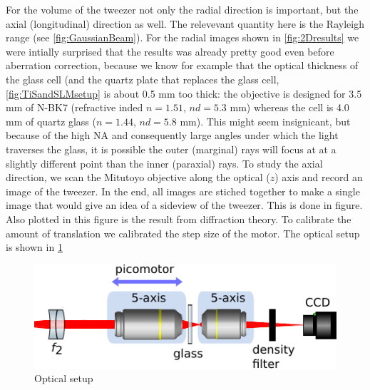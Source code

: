 For the volume of the tweezer not only the radial direction is important, but the axial (longitudinal) direction as well. 
The relevevant quantity here is the Rayleigh range (see \cref{fig:GaussianBeam}).
For the radial images shown in \cref{fig:2Dresults} we were intially surprised that the results was already pretty good even before aberration correction, because we know for example that the optical thickness of the glass cell (and the quartz plate that replaces the glass cell, \cref{fig:TiSandSLMsetup} is about 0.5 mm too thick: the objective is designed for 3.5 mm of N-BK7 (refractive inded $n = 1.51$, $nd = 5.3$ mm) whereas the cell is 4.0 mm of quartz glass ($n = 1.44$, $nd = 5.8$ mm). 
This might seem insignicant, but because of the high \ac{NA} and consequently large angles under which the light traverses the glass, it is possible the outer (marginal) rays will focus at at a slightly different point than the inner (paraxial) rays. 
To study the axial direction, we scan the Mitutoyo objective along the optical ($z$) axis and record an image of the tweezer. 
In the end, all images are stiched together to make a single image that would give an idea of a sideview of the tweezer.
This is done in figure.
Also plotted in this figure is the result from diffraction theory. 
To calibrate the amount of translation we calibrated the step size of the motor. The optical setup is shown in \cref{fig:ZScanSetup}

\begin{figure}
    \centering
    \includegraphics[width=0.6\linewidth]{figures/ZScanSetup.pdf}
    \caption{Optical setup}
    \label{fig:ZScanSetup}
\end{figure}

